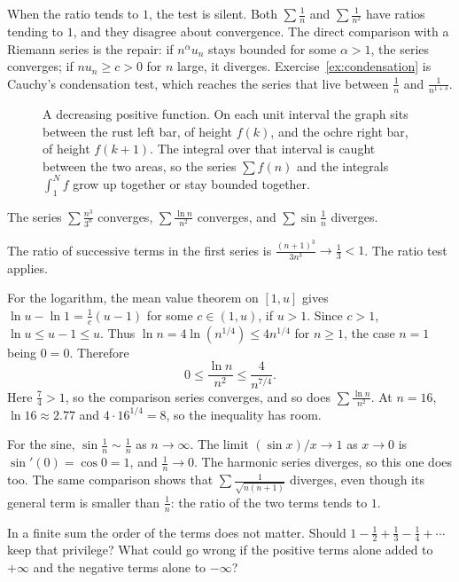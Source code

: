 When the ratio tends to $1$, the test is silent. Both $\sum\frac1n$ and $\sum\frac1{n^2}$ have ratios tending to $1$, and they disagree about convergence. The direct comparison with a Riemann series is the repair: if $n^\alpha u_n$ stays bounded for some $\alpha>1$, the series converges; if $nu_n\ge c>0$ for $n$ large, it diverges. Exercise~\ref{ex:condensation} is Cauchy's condensation test, which reaches the series that live between $\frac1n$ and $\frac1{n^{1+\delta}}$.

\begin{figure}[ht]
\centering
{}
\caption{A decreasing positive function. On each unit interval the graph sits between the rust left bar, of height $f(k)$, and the ochre right bar, of height $f(k+1)$. The integral over that interval is caught between the two areas, so the series $\sum f(n)$ and the integrals $\int_1^N f$ grow up together or stay bounded together.}
\label{fig:integral}
\end{figure}

\begin{examplex}
The series $\sum\frac{n^3}{3^n}$ converges, $\sum\frac{\ln n}{n^2}$ converges, and $\sum\sin\frac1n$ diverges.
\end{examplex}

The ratio of successive terms in the first series is $\frac{(n+1)^3}{3n^3}\to\frac13<1$. The ratio test applies.

For the logarithm, the mean value theorem on $[1,u]$ gives $\ln u-\ln1=\frac1c(u-1)$ for some $c\in(1,u)$, if $u>1$. Since $c>1$, $\ln u\le u-1\le u$. Thus $\ln n=4\ln(n^{1/4})\le4n^{1/4}$ for $n\ge1$, the case $n=1$ being $0=0$. Therefore
\[
0\le\frac{\ln n}{n^2}\le\frac{4}{n^{7/4}}.
\]
Here $\frac74>1$, so the comparison series converges, and so does $\sum\frac{\ln n}{n^2}$. At $n=16$, $\ln16\approx2.77$ and $4\cdot16^{1/4}=8$, so the inequality has room.

For the sine, $\sin\frac1n\sim\frac1n$ as $n\to\infty$. The limit $(\sin x)/x\to 1$ as $x\to 0$ is $\sin'(0)=\cos 0=1$, and $\frac1n\to 0$. The harmonic series diverges, so this one does too. The same comparison shows that $\sum\frac1{\sqrt{n(n+1)}}$ diverges, even though its general term is smaller than $\frac1n$: the ratio of the two terms tends to $1$.

\begin{think}
In a finite sum the order of the terms does not matter. Should $1-\frac12+\frac13-\frac14+\cdots$ keep that privilege? What could go wrong if the positive terms alone added to $+\infty$ and the negative terms alone to $-\infty$?
\end{think}


